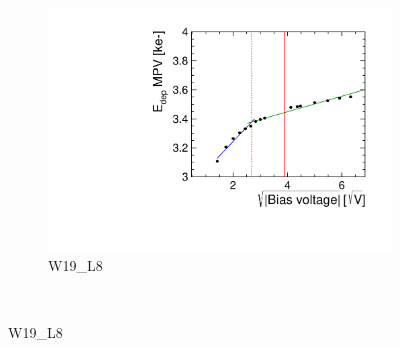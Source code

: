 \begin{figure}[htbp]
\begin{subfigure}[b]{0.33\textwidth}
    \includegraphics[width=\textwidth]{./figures/TestBeam/depletionVoltage_W0019_L08_Edep.pdf}
    \caption{W19\_L8}
  \end{subfigure} \\


\end{figure}
